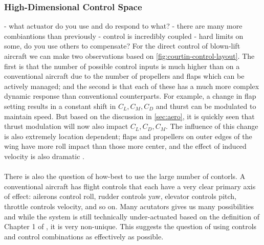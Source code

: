 \subsubsection{High-Dimensional Control Space} \label{sec:acuation}
- what actuator do you use and do respond to what?
- there are many more combiantions than previously
- control is incredibly coupled
- hard limits on some, do you use others to compensate?
For the direct control of blown-lift aircraft we can make two observations based on \cref{fig:courtin-control-layout}. The first is that the number of possible control inputs is much higher than on a conventional aircraft due to the number of propellers and flaps which can be actively managed; and the second is that each of these has a much more complex dynamic response than conventional counterparts. 
For example, a change in flap setting results in a constant shift in $C_L, C_M, C_D$ and thurst can be modulated to maintain speed. 
But based on the discussion in \cref{sec:aero}, it is quickly seen that thrust modulation will now also impact $C_L, C_D, C_M$.
The influence of this change is also extremely location dependent; flaps and propellers on outer edges of the wing have more roll impact than those more center, and the effect of induced velocity is also dramatic \cite{courtin_performance_nodate}.\\
\\
There is also the question of how-best to use the large number of contorls. 
A conventional aircraft has flight controls that each have a very clear primary axis of effect: ailerons control roll, rudder controls yaw, elevator controls pitch, throttle controls velocity, and so on. 
Many acutators gives us many possibilities and while the system is still technically under-actuated based on the definition of Chapter 1 of \cite{tedrake-underactuated}, it is very non-unique.
This suggests the question of using controls and control combinations as effectively as possible. \\

